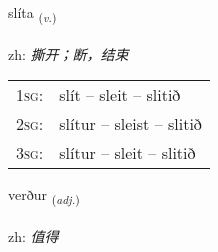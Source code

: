 \documentclass[frontgrid, backgrid]{flacards}\usepackage[]{graphicx}\usepackage[]{color}
\begin{document}
\renewcommand{\flhead}{\vskip5pt \fboxsep=0pt {\small\bfseries\footnotesize Sagnorð | 动词}}
\renewcommand{\fcfoot}{\vskip5pt \fboxsep=0pt \hspace{2pt}{\small\bfseries\footnotesize 2K}}

\renewcommand{\blhead}{\vskip5pt {\small\bfseries\footnotesize Sagnorð | 动词 }}
\renewcommand{\bcfoot}{\vskip5pt \hspace{2pt}{\small\bfseries\footnotesize 2K}}


{slíta \small{\textsubscript{(\textit{v.})}} \\[1ex] %
\textphonetic{[stliːta]} \\
zh: \emph{撕开；断，结束} \\  [2ex]
\renewcommand*{\arraystretch}{0.8}
\begin{tabular}{p{1cm}l}
\textsc{1sg}: & slít -- sleit -- slitið \\ 
\textsc{2sg}: & slítur -- sleist -- slitið \\ 
\textsc{3sg}: & slítur -- sleit -- slitið \\ 
\end{tabular}
}

\renewcommand{\flhead}{\vskip5pt \fboxsep=0pt {\small\bfseries\footnotesize Lýsingarorð | 形容词}}
\renewcommand{\fcfoot}{\vskip5pt \fboxsep=0pt \hspace{2pt}{\small\bfseries\footnotesize 2K}}

\renewcommand{\blhead}{\vskip5pt {\small\bfseries\footnotesize Lýsingarorð | 形容词 }}
\renewcommand{\bcfoot}{\vskip5pt \hspace{2pt}{\small\bfseries\footnotesize 2K}}


{verður \small{\textsubscript{(\textit{adj.})}} \\[1ex] %
\textphonetic{[vɛrðʏr]} \\
zh: \emph{值得} \\  [2ex]
\renewcommand*{\arraystretch}{0.8}
}
\end{document}
